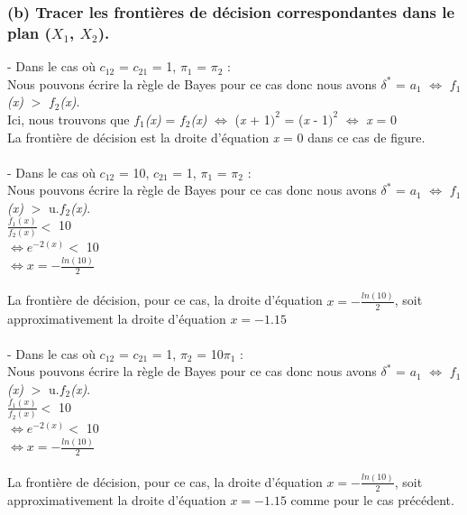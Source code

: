 \documentclass[a4paper, 10pt]{article}
\begin{document}
\subsubsection*{(b) Tracer les frontières de décision correspondantes dans le plan (\textit{$X_{1}$}, \textit{$X_{2}$}).}
- Dans le cas où \textit{$c_{12}$} = \textit{$c_{21}$} = 1, $\pi_{1}$ = $\pi_{2}$ :\\
Nous pouvons écrire la règle de Bayes pour ce cas donc nous avons $\delta^{*}$ = \textit{$a_{1}$}
$\Leftrightarrow$ \textit{$f_{1}$(x)} $>$ \textit{$f_{2}$(x)}.\\
Ici, nous trouvons que \textit{$f_{1}$(x)} = \textit{$f_{2}$(x)}
$\Leftrightarrow$ (\textit{x} + 1$)^{2}$ = (\textit{x} - 1$)^{2}$
$\Leftrightarrow$ \textit{x} = 0\\
La frontière de décision est la droite d'équation \textit{x} = 0 dans ce cas de figure.\\ \\
- Dans le cas où \textit{$c_{12}$} = 10, \textit{$c_{21}$} = 1, $\pi_{1}$ = $\pi_{2}$ :\\
Nous pouvons écrire la règle de Bayes pour ce cas donc nous avons $\delta^{*}$ = \textit{$a_{1}$}
$\Leftrightarrow$ \textit{$f_{1}$(x)} $>$ u.\textit{$f_{2}$(x)}.\\
$\frac{f_{1}(x)}{f_{2}(x)} <$ 10\\
$\Leftrightarrow e^{-2(x)} <$ 10\\
$\Leftrightarrow x = -\frac{ln(10)}{2}$\\ \\
La frontière de décision, pour ce cas, la droite d'équation $x = -\frac{ln(10)}{2}$, soit approximativement la droite d'équation $x = -1.15$\\ \\
- Dans le cas où \textit{$c_{12}$} = \textit{$c_{21}$} = 1, $\pi_{2}$ = 10$\pi_{1}$ :\\
Nous pouvons écrire la règle de Bayes pour ce cas donc nous avons $\delta^{*}$ = \textit{$a_{1}$}
$\Leftrightarrow$ \textit{$f_{1}$(x)} $>$ u.\textit{$f_{2}$(x)}.\\
$\frac{f_{1}(x)}{f_{2}(x)} <$ 10\\
$\Leftrightarrow e^{-2(x)} <$ 10\\
$\Leftrightarrow x = -\frac{ln(10)}{2}$\\ \\
La frontière de décision, pour ce cas, la droite d'équation $x = -\frac{ln(10)}{2}$, soit approximativement la droite d'équation $x = -1.15$
comme pour le cas précédent.
\end{document}

